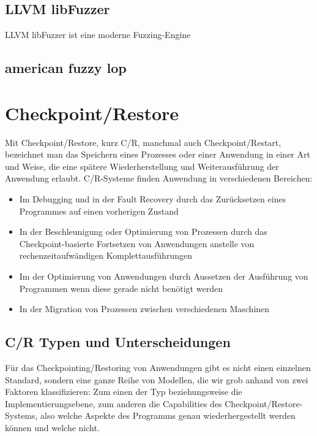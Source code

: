 \documentclass[a4paper]{article}
\begin{document}
\subsection{LLVM libFuzzer}
LLVM libFuzzer ist eine moderne Fuzzing-Engine 

\subsection{american fuzzy lop}

\section{Checkpoint/Restore}
Mit Checkpoint/Restore, kurz C/R, manchmal auch Checkpoint/Restart, bezeichnet man das Speichern eines Prozesses oder einer Anwendung in einer Art und Weise, die eine spätere Wiederherstellung und Weiterausführung der Anwendung erlaubt.
C/R-Systeme finden Anwendung in verschiedenen Bereichen:
\begin{itemize}
    \item Im Debugging und in der Fault Recovery durch das Zurücksetzen eines Programmes auf einen vorherigen Zustand
    \item In der Beschleunigung oder Optimierung von Prozessen durch das Checkpoint-basierte Fortsetzen von Anwendungen anstelle von rechenzeitaufwändigen Komplettausführungen
    \item Im der Optimierung von Anwendungen durch Aussetzen der Ausführung von Programmen wenn diese gerade nicht benötigt werden
    \item In der Migration von Prozessen zwischen verschiedenen Maschinen
\end{itemize}

\subsection{C/R Typen und Unterscheidungen}
Für das Checkpointing/Restoring von Anwendungen gibt es nicht einen einzelnen Standard, sondern eine ganze Reihe von Modellen, die wir grob anhand von zwei Faktoren klassifizieren: Zum einen der Typ beziehungsweise die Implementierungsebene, zum anderen die Capabilities des Checkpoint/Restore-Systems, also welche Aspekte des Programms genau wiederhergestellt werden können und welche nicht.
\end{document}

